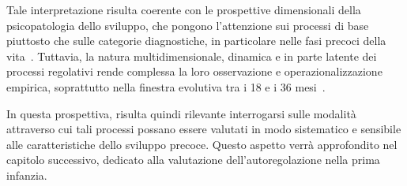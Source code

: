             Tale interpretazione risulta coerente con le prospettive dimensionali della psicopatologia dello sviluppo, che pongono l'attenzione sui processi di base piuttosto che sulle categorie diagnostiche, in particolare nelle fasi precoci della vita~\cite{caspi2014,kotov2017}. Tuttavia, la natura multidimensionale, dinamica e in parte latente dei processi regolativi rende complessa la loro osservazione e operazionalizzazione empirica, soprattutto nella finestra evolutiva tra i 18 e i 36 mesi~\cite{cole2004,eisenberg2010}.

            In questa prospettiva, risulta quindi rilevante interrogarsi sulle modalità attraverso cui tali processi possano essere valutati in modo sistematico e sensibile alle caratteristiche dello sviluppo precoce. Questo aspetto verrà approfondito nel capitolo successivo, dedicato alla valutazione dell'autoregolazione nella prima infanzia.
